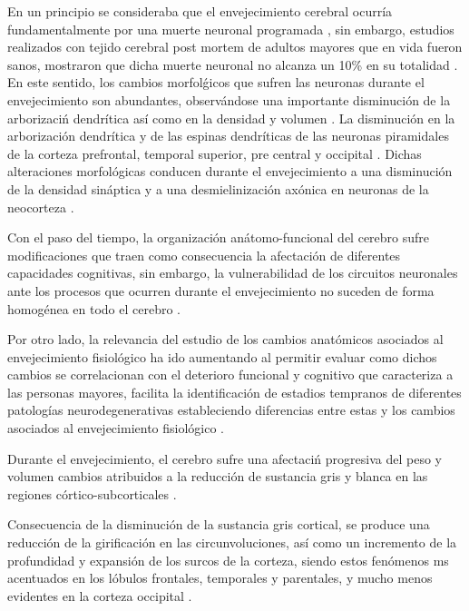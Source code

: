 En un principio se consideraba que el envejecimiento cerebral ocurr\'ia fundamentalmente por una 
muerte neuronal programada \cite{Coleman87}, sin embargo, estudios realizados con tejido cerebral 
post mortem de adultos mayores que en vida fueron sanos, mostraron que dicha muerte neuronal no 
alcanza un 10\% en su totalidad \cite{Esiri07}. En este sentido, los cambios morfol\'gicos que 
sufren las neuronas durante el envejecimiento son abundantes, observ\'andose una importante 
disminuci\'on de la arborizaci\'n dendr\'itica as\'i como en la densidad y volumen \cite{Hita14}. 
La disminución en la arborización dendr\'itica y de las espinas dendr\'iticas de las neuronas 
piramidales de la corteza prefrontal, temporal superior, pre central y occipital \cite{Hita14}. 
Dichas alteraciones morfol\'ogicas conducen durante el envejecimiento a una disminuci\'on de 
la densidad sin\'aptica y a una desmielinizaci\'on ax\'onica en neuronas de la 
neocorteza \cite{Terry}.

Con el paso del tiempo, la organizaci\'on an\'atomo-funcional del cerebro sufre modificaciones 
que traen como consecuencia la afectaci\'on de diferentes capacidades cognitivas, sin embargo, 
la vulnerabilidad de los circuitos neuronales ante los procesos que ocurren durante el 
envejecimiento no suceden de forma homogénea en todo el cerebro \cite{Hita14}.

Por otro lado, la relevancia del estudio de los cambios anat\'omicos asociados al envejecimiento 
fisiol\'ogico ha ido aumentando al permitir evaluar como dichos cambios se correlacionan con 
el deterioro funcional y cognitivo que caracteriza a las personas mayores, facilita la 
identificaci\'on de estadios tempranos de diferentes patolog\'ias neurodegenerativas estableciendo 
diferencias entre estas y los cambios asociados al envejecimiento fisiol\'ogico \cite{Hita14}.

Durante el envejecimiento, el cerebro sufre una afectaci\'n progresiva del peso \cite{Dekaban78} 
y volumen \cite{Hubbard81} cambios atribuidos a la reducci\'on de sustancia gris y blanca en
las regiones c\'ortico-subcorticales \cite{Hita14}.

Consecuencia de la disminuci\'on de la sustancia gris cortical, se produce una reducci\'on de 
la girificaci\'on en las circunvoluciones, as\'i como un incremento de la profundidad y 
expansi\'on de los surcos de la corteza, siendo estos fen\'omenos ms acentuados en los l\'obulos 
frontales, temporales y parentales, y mucho menos evidentes en la corteza occipital \cite{Raz05}.

